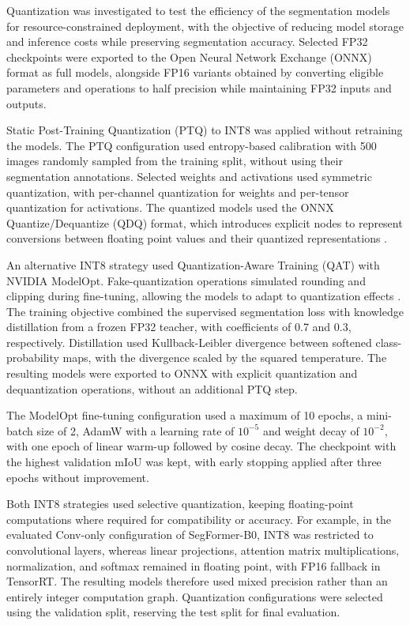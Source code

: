 Quantization was investigated to test the efficiency of the segmentation models for resource-constrained deployment, with the objective of reducing model storage and inference costs while preserving segmentation accuracy. Selected FP32 checkpoints were exported to the Open Neural Network Exchange (ONNX) format as full  models, alongside FP16 variants obtained by converting eligible parameters and operations to half precision while maintaining FP32 inputs and outputs.

Static Post-Training Quantization (PTQ) to INT8 was applied without retraining the models. The PTQ configuration used entropy-based calibration with 500 images randomly sampled from the training split, without using their segmentation annotations. Selected weights and activations used symmetric quantization, with per-channel quantization for weights and per-tensor quantization for activations. The quantized models used the ONNX Quantize/Dequantize (QDQ) format, which introduces explicit nodes to represent conversions between floating point values and their quantized representations \cite{onnxruntimeQuantization}.

An alternative INT8 strategy used Quantization-Aware Training (QAT) with NVIDIA ModelOpt. Fake-quantization operations simulated rounding and clipping during fine-tuning, allowing the models to adapt to quantization effects \cite{jacob2018quantization}. The training objective combined the supervised segmentation loss with knowledge distillation from a frozen FP32 teacher, with coefficients of 0.7 and 0.3, respectively. Distillation used Kullback-Leibler divergence between softened class-probability maps, with the divergence scaled by the squared temperature. The resulting models were exported to ONNX with explicit quantization and dequantization operations, without an additional PTQ step.

The ModelOpt fine-tuning configuration used a maximum of 10 epochs, a mini-batch size of 2, AdamW with a learning rate of \(10^{-5}\) and weight decay of \(10^{-2}\), with one epoch of linear warm-up followed by cosine decay. The checkpoint with the highest validation mIoU was kept, with early stopping applied after three epochs without improvement.

Both INT8 strategies used selective quantization, keeping floating-point computations where required for compatibility or accuracy. For example, in the evaluated Conv-only configuration of SegFormer-B0, INT8 was restricted to convolutional layers, whereas linear projections, attention matrix multiplications, normalization, and softmax remained in floating point, with FP16 fallback in TensorRT. The resulting models therefore used mixed precision rather than an entirely integer computation graph.
Quantization configurations were selected using the validation split, reserving the test split for final evaluation.
